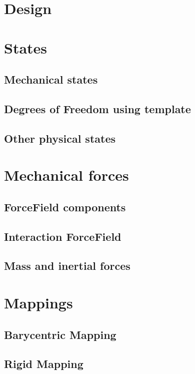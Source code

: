 \documentclass[a4paper,10pt]{report}
\begin{document}
\chapter{Design}
\graphicspath{{../design/}}  %




\chapter{States}
\section{Mechanical states}
\section{Degrees of Freedom using template}
\section{Other physical states}


\chapter{Mechanical forces}
\section{ForceField components}

\section{Interaction ForceField}
\label{sec:interactionforcefield}

\section{Mass and inertial forces}


\chapter{Mappings}

\section{Barycentric Mapping}
\section{Rigid Mapping}
\end{document}
